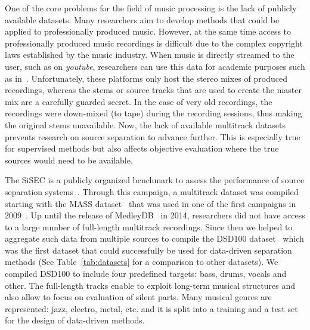 One of the core problems for the field of music processing is the lack of publicly available datasets.
Many researchers aim to develop methods that could be applied to professionally produced music. 
However, at the same time access to professionally produced music recordings is difficult due to the complex copyright laws established by the music industry.
When music is directly streamed to the user, such as on \emph{youtube}, researchers can use this data for academic purposes such as in~\cite{balke17}.
Unfortunately, these platforms only host the stereo mixes of produced recordings, whereas the stems or source tracks that are used to create the master mix are a carefully guarded secret.
In the case of very old recordings, the recordings were down-mixed (to tape) during the recording sessions, thus making the original stems unavailable.
Now, the lack of available multitrack datasets prevents research on source separation to advance further.
This is especially true for supervised methods but also affects objective evaluation where the true sources would need to be available.
\par
The \ac{SiSEC} is a publicly organized benchmark to assess the performance of source separation systems~\cite{sisec13, ono15, liutkus17, stoeter18sisec}. 
Through this campaign, a multitrack dataset was compiled starting with the MASS dataset~\cite{MTGMASSdb} that was used in one of the first campaigns in 2009~\cite{vincent09}.
Up until the release of MedleyDB~\cite{bittner14} in 2014, researchers did not have access to a large number of full-length multitrack recordings.
Since then we helped to aggregate such data from multiple sources to compile the DSD100 dataset~\cite{liutkus17} which was the first dataset that could successfully be used for data-driven separation methods (See Table~\ref{tab:datasets} for a comparison to other datasets).
We compiled DSD100 to include four predefined targets: bass, drums, vocals and other.
The full-length tracks enable to exploit long-term musical structures and also allow to focus on evaluation of silent parts.
Many musical genres are represented: jazz, electro, metal, etc. and it is split into a training and a test set for the design of data-driven methods.

